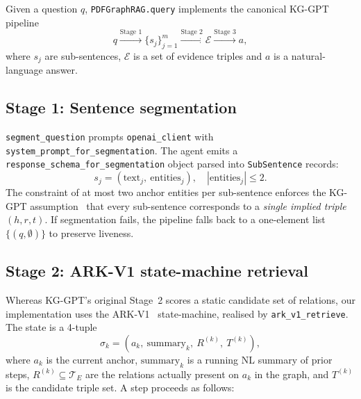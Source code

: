 \documentclass[11pt,a4paper]{article}
\begin{document}
Given a question $q$, \texttt{PDFGraphRAG.query} implements the canonical
KG-GPT pipeline~\cite{kggpt2023}
\[
q \xrightarrow{\text{Stage 1}} \{s_j\}_{j=1}^m
  \xrightarrow{\text{Stage 2}} \mathcal{E}
  \xrightarrow{\text{Stage 3}} a,
\]
where $s_j$ are sub-sentences, $\mathcal{E}$ is a set of evidence triples and
$a$ is a natural-language answer.

\subsection{Stage 1: Sentence segmentation}

\texttt{segment\_question} prompts \texttt{openai\_client} with
\texttt{system\_prompt\_for\_segmentation}. The agent emits a
\texttt{response\_schema\_for\_segmentation} object parsed into
\texttt{SubSentence} records:
\[
s_j=(\text{text}_j,\ \text{entities}_j),\quad |\text{entities}_j|\leq 2.
\]
The constraint of at most two anchor entities per sub-sentence enforces the
KG-GPT assumption~\cite{kggpt2023} that every sub-sentence corresponds to a
\emph{single implied triple} $(h,r,t)$. If segmentation fails, the pipeline
falls back to a one-element list $\{(q,\emptyset)\}$ to preserve liveness.

\subsection{Stage 2: ARK-V1 state-machine retrieval}

Whereas KG-GPT's original Stage~2 scores a static candidate set of relations,
our implementation uses the ARK-V1~\cite{arkv12025} state-machine, realised by
\texttt{ark\_v1\_retrieve}. The state is a 4-tuple
\[
\sigma_k=(a_k,\ \text{summary}_k,\ R^{(k)},\ T^{(k)}),
\]
where $a_k$ is the current anchor, $\text{summary}_k$ is a running NL
summary of prior steps, $R^{(k)}\subseteq\mathcal{T}_E$ are the relations
actually present on $a_k$ in the graph, and $T^{(k)}$ is the candidate triple
set. A step proceeds as follows:
\end{document}
